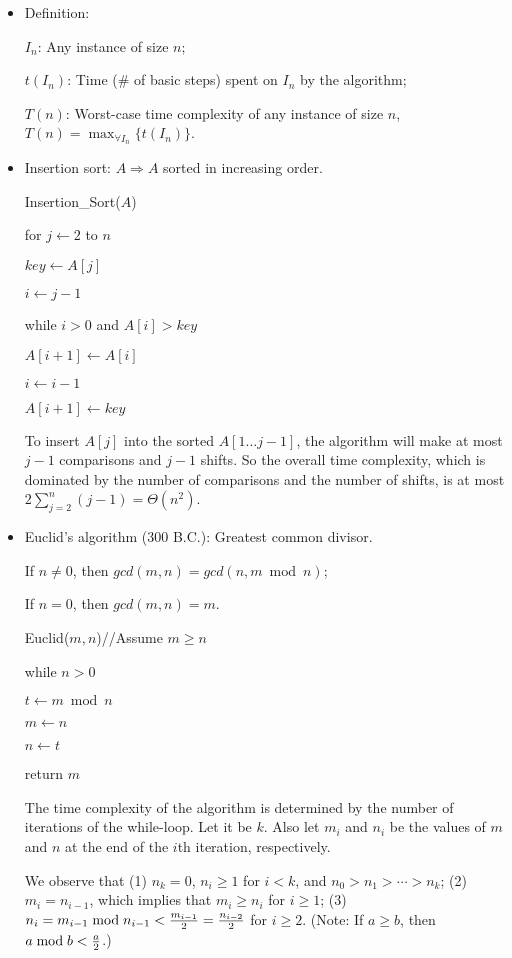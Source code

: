 \documentclass{article}
\begin{document}
\begin{itemize}

\item Definition: 

$I_n$: Any instance of size $n$;

$t(I_n)$: Time (\# of basic steps) spent on $I_n$ by the algorithm;

$T(n)$: Worst-case time complexity of any instance of size $n$,
$T(n)=\max_{\forall I_n}\{t(I_n)\}$.

\item Insertion sort: $A\Rightarrow A$ sorted in increasing order.

Insertion\_Sort($A$)
\par\quad for $j\leftarrow 2$ to $n$
\par\quad\quad $key\leftarrow A[j]$
\par\quad\quad $i\leftarrow j-1$
\par\quad\quad while $i>0$ and $A[i]>key$
\par\quad\quad\quad $A[i+1]\leftarrow A[i]$
\par\quad\quad\quad $i\leftarrow i-1$
\par\quad\quad $A[i+1]\leftarrow key$

To insert $A[j]$ into the sorted $A[1\ldots j-1]$, the algorithm
will make at most $j-1$ comparisons and $j-1$ shifts. So the overall 
time complexity,
which is dominated by the number of comparisons and the number of
shifts, is at most $2\sum_{j=2}^n(j-1)
=\Theta(n^2)$.

\item Euclid's algorithm (300 B.C.): Greatest common divisor.

If $n\not=0$, then $gcd(m,n)=gcd(n, m \bmod n)$;

If $n=0$, then $gcd(m,n)=m$.

Euclid($m,n$)\qquad //Assume $m\ge n$
\par\quad while $n>0$
\par\quad\quad $t\leftarrow m\bmod n$
\par\quad\quad $m\leftarrow n$
\par\quad\quad $n\leftarrow t$
\par\quad return $m$

The time complexity of the algorithm is determined by the number of iterations
of the while-loop. Let it be $k$. Also let $m_i$ and $n_i$ be the values of
$m$ and $n$ at the end of the $i$th iteration, respectively.

We observe that (1) $n_k=0$, $n_i\ge 1$ for $i<k$, and 
$n_0>n_1>\cdots>n_k$; (2) $m_i=n_{i-1}$, which implies that $m_i\ge n_i$ 
for $i\ge1$; (3) $n_i=m_{i-1} \bmod n_{i-1}<{m_{i-1}\over2}={n_{i-2}\over2}$
for $i\ge2$. (Note: If $a\ge b$, then $a\bmod b<{a\over2}$.)


\end{itemize}
\end{document}
